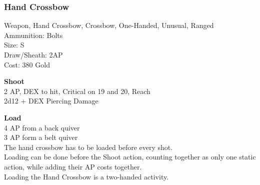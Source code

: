 \subsubsection{Hand Crossbow}\label{weapon:handCrossbow}
Weapon, Hand Crossbow, Crossbow, One-Handed, Unusual, Ranged\\
Ammunition: Bolts\\
Size: S\\
Draw/Sheath: 2AP\\
Cost: 380 Gold

\textbf{Shoot} \\
2 AP, DEX to hit, Critical on 19 and 20,  Reach\\
2d12 + \texttimes DEX Piercing Damage

\textbf{Load} \\
4 AP from a back quiver\\
3 AP form a belt quiver\\
The hand crossbow has to be loaded before every shot.\\
Loading can be done before the Shoot action, counting together as only one static action, while adding their AP costs together.\\
Loading the Hand Crossbow is a two-handed activity.
